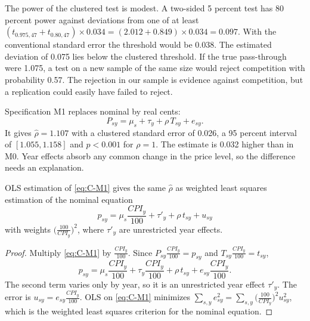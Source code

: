 The power of the clustered test is modest. A two-sided 5 percent test has 80 percent power against deviations from
one of at least $(t_{0.975, 47} + t_{0.80, 47})\times 0.034 = (2.012 + 0.849)\times0.034 = 0.097$. With the
conventional standard error the threshold would be 0.038. The estimated deviation of 0.075 lies below the clustered
threshold. If the true pass-through were 1.075, a test on a new sample of the same size would reject competition
with probability 0.57. The rejection in our sample is evidence against competition, but a replication could easily
have failed to reject.

Specification M1 replaces nominal by real cents:
\begin{equation}\label{eq:C-M1}
P_{sy} = \mu_s + \tau_y + \rho\,T_{sy} + e_{sy} .
\end{equation}
It gives $\hat\rho = 1.107$ with a clustered standard error of 0.026, a 95 percent interval of $[1.055, 1.158]$
and $p < 0.001$ for $\rho = 1$. The estimate is 0.032 higher than in M0. Year effects absorb any common change in the
price level, so the difference needs an explanation.

\begin{lemma}\label{lem:C-deflate}
OLS estimation of \eqref{eq:C-M1} gives the same $\hat\rho$ as weighted least squares estimation of the nominal
equation
\begin{equation*}
p_{sy} = \mu_s\frac{CPI_y}{100} + \tau'_y + \rho\,t_{sy} + u_{sy}
\end{equation*}
with weights $\big(\frac{100}{CPI_y}\big)^2$, where $\tau'_y$ are unrestricted year effects.
\end{lemma}

\begin{proof}
Multiply \eqref{eq:C-M1} by $\frac{CPI_y}{100}$. Since $P_{sy}\frac{CPI_y}{100} = p_{sy}$ and
$T_{sy}\frac{CPI_y}{100} = t_{sy}$,
\begin{equation*}
p_{sy} = \mu_s\frac{CPI_y}{100} + \tau_y\frac{CPI_y}{100} + \rho\,t_{sy} + e_{sy}\frac{CPI_y}{100} .
\end{equation*}
The second term varies only by year, so it is an unrestricted year effect $\tau'_y$. The error is
$u_{sy} = e_{sy}\frac{CPI_y}{100}$. OLS on \eqref{eq:C-M1} minimizes
$\sum_{s,y}e_{sy}^2 = \sum_{s,y}\big(\frac{100}{CPI_y}\big)^2u_{sy}^2$, which is the weighted least squares
criterion for the nominal equation.
\end{proof}

